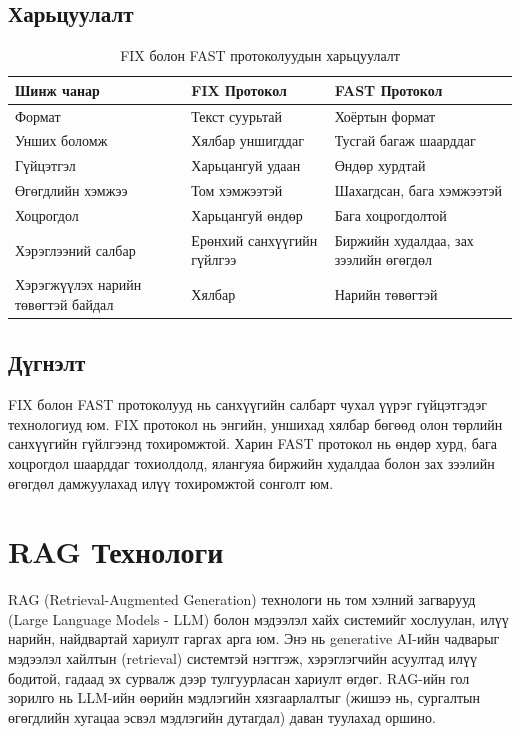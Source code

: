 \documentclass[12pt,A4]{report}
\begin{document}
\subsection{Харьцуулалт}

\begin{table}[h]
\centering
\begin{tabular}{|l|p{5cm}|p{5cm}|}
\hline
\textbf{Шинж чанар} & \textbf{FIX Протокол} & \textbf{FAST Протокол} \\
\hline
\hline
Формат & Текст суурьтай & Хоёртын формат \\
\hline
Унших боломж & Хялбар уншигддаг & Тусгай багаж шаарддаг \\
\hline
Гүйцэтгэл & Харьцангуй удаан & Өндөр хурдтай \\
\hline
Өгөгдлийн хэмжээ & Том хэмжээтэй & Шахагдсан, бага хэмжээтэй \\
\hline
Хоцрогдол & Харьцангуй өндөр & Бага хоцрогдолтой \\
\hline
Хэрэглээний салбар & Ерөнхий санхүүгийн гүйлгээ & Биржийн худалдаа, зах зээлийн өгөгдөл \\
\hline
Хэрэгжүүлэх нарийн төвөгтэй байдал & Хялбар & Нарийн төвөгтэй \\
\hline
\end{tabular}
\caption{FIX болон FAST протоколуудын харьцуулалт}
\end{table}

\subsection{Дүгнэлт}

FIX болон FAST протоколууд нь санхүүгийн салбарт чухал үүрэг гүйцэтгэдэг технологиуд юм. FIX протокол нь энгийн, уншихад хялбар бөгөөд олон төрлийн санхүүгийн гүйлгээнд тохиромжтой. Харин FAST протокол нь өндөр хурд, бага хоцрогдол шаарддаг тохиолдолд, ялангуяа биржийн худалдаа болон зах зээлийн өгөгдөл дамжуулахад илүү тохиромжтой сонголт юм.

\section{RAG Технологи}

RAG (Retrieval-Augmented Generation) технологи нь том хэлний загварууд (Large Language Models - LLM) болон мэдээлэл хайх системийг хослуулан, илүү нарийн, найдвартай хариулт гаргах арга юм. Энэ нь generative AI-ийн чадварыг мэдээлэл хайлтын (retrieval) системтэй нэгтгэж, хэрэглэгчийн асуултад илүү бодитой, гадаад эх сурвалж дээр тулгуурласан хариулт өгдөг. RAG-ийн гол зорилго нь LLM-ийн өөрийн мэдлэгийн хязгаарлалтыг (жишээ нь, сургалтын өгөгдлийн хугацаа эсвэл мэдлэгийн дутагдал) даван туулахад оршино.\cite{rag?}
\end{document}
